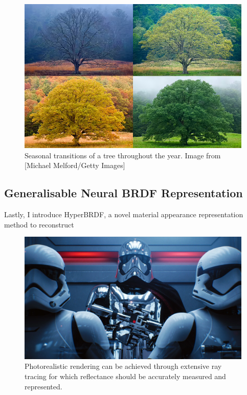 \begin{figure}[ht]
  \centering

    \includegraphics[width=0.6\linewidth]{Images/seasonchanges.png}

   \caption{Seasonal transitions of a tree throughout the year. Image from [Michael Melford/Getty Images]}
   \label{fig:colour-approximate}
\end{figure}

\subsection{Generalisable Neural BRDF Representation}
Lastly, I introduce HyperBRDF, a novel material appearance representation method to reconstruct 

\begin{figure}[ht]
  \centering

    \includegraphics[width=\linewidth]{Images/StarWars-RayTracing.jpeg}

   \caption{Photorealistic rendering can be achieved through extensive ray tracing for which reflectance should be accurately measured and represented.}
   \label{fig:colour-approximate}
\end{figure}



